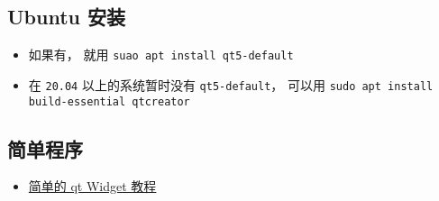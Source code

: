 \subsection{Ubuntu 安装}
\begin{itemize}
\item 如果有， 就用 \verb|suao apt install qt5-default|
\item 在 \verb|20.04| 以上的系统暂时没有 \verb|qt5-default|， 可以用 \verb|sudo apt install build-essential qtcreator|
\end{itemize}

\subsection{简单程序}
\begin{itemize}
\item \href{https://doc.qt.io/qt-5/qtwidgets-tutorials-notepad-example.html}{简单的 qt Widget 教程}
\end{itemize}
